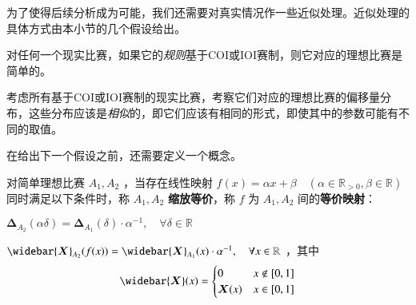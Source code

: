         为了使得后续分析成为可能，我们还需要对真实情况作一些近似处理。近似处理的具体方式由本小节的几个假设给出。

        \begin{assumption}
            对任何一个现实比赛，如果它的\emph{规则}基于COI或IOI赛制，则它对应的理想比赛是简单的。

            \label{ass:simplicityOfCodingContests}
        \end{assumption}

        \begin{assumption}
            考虑所有基于COI或IOI赛制的现实比赛，考察它们对应的理想比赛的偏移量分布，这些分布应该是\emph{相似}的，即它们应该有相同的形式，即使其中的参数可能有不同的取值。

            \label{ass:similarityOfDeltaDistributions}
        \end{assumption}

        在给出下一个假设之前，还需要定义一个概念。

        \begin{definition}[缩放等价]
            对简单理想比赛 $A_1,A_2$ ，当存在线性映射 $f(x)=\alpha x+\beta\quad(\alpha\in\mathbb{R}_{> 0},\beta\in\mathbb{R})$ 同时满足以下条件时，称 $A_1,A_2$ \textbf{缩放等价}，称 $f$ 为 $A_1,A_2$ 间的\textbf{等价映射}：
            \begin{asparaenum}
                \item $\bm{\Delta}_{A_2}(\alpha\delta)=\bm{\Delta}_{A_1}(\delta)\cdot \alpha^{-1},\quad\forall \delta\in\mathbb{R}$
                \item $\widebar{\bm{X}}_{A_2}(f(x))=\widebar{\bm{X}}_{A_1}(x)\cdot \alpha^{-1},\quad\forall x\in\mathbb{R}$ ，其中
                    $$
                        \widebar{\bm{X}}(x)=
                        \begin{cases} 
                            0 & x\notin [0,1] \\
                            \bm{X}(x) & x\in[0,1]
                        \end{cases}
                    $$
            \end{asparaenum}

            \label{def:equivalenceAfterScaling}
        \end{definition}

